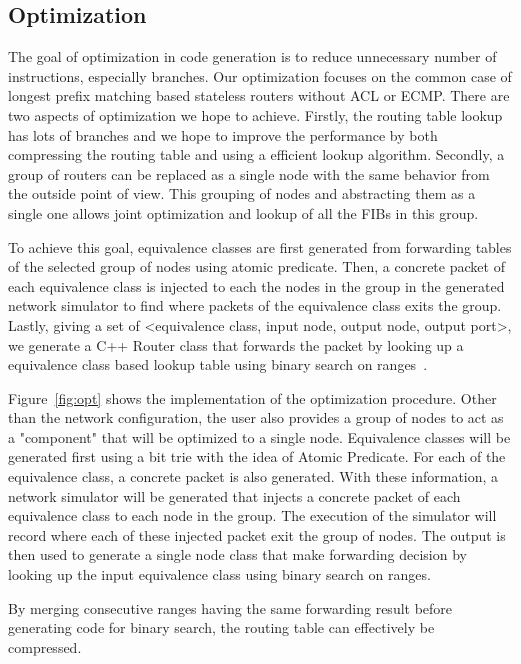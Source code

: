 \documentclass[letterpaper, 10 pt, conference]{ieeeconf}  %
\begin{document}
\subsection{Optimization}\label{sec:opt}
The goal of optimization in code generation is to reduce unnecessary number of instructions, especially branches. Our optimization focuses on the common case of longest prefix matching based stateless routers without ACL or ECMP. There are two aspects of optimization we hope to achieve. Firstly, the routing table lookup has lots of branches and we hope to improve the performance by both compressing the routing table and using a efficient lookup algorithm. Secondly, a group of routers can be replaced as a single node with the same behavior from the outside point of view. This grouping of nodes and abstracting them as a single one allows joint optimization and lookup of all the FIBs in this group.

To achieve this goal, equivalence classes are first generated from forwarding tables of the selected group of nodes using atomic predicate. Then, a concrete packet of each equivalence class is injected to each the nodes in the group in the generated network simulator to find where packets of the equivalence class exits the group. Lastly, giving a set of <equivalence class, input node, output node, output port>, we generate a C++ Router class that forwards the packet by looking up a equivalence class based lookup table using binary search on ranges~\cite{binary_search_lookup}.

Figure~\ref{fig:opt} shows the implementation of the optimization procedure. Other than the network configuration, the user also provides a group of nodes to act as a "component" that will be optimized to a single node. Equivalence classes will be generated first using a bit trie with the idea of Atomic Predicate. For each of the equivalence class, a concrete packet is also generated. With these information, a network simulator will be generated that injects a concrete packet of each equivalence class to each node in the group. The execution of the simulator will record where each of these injected packet exit the group of nodes. The output is then used to generate a single node class that make forwarding decision by looking up the input equivalence class using binary search on ranges.

By merging consecutive ranges having the same forwarding result before generating code for binary search, the routing table can effectively be compressed.
\end{document}
